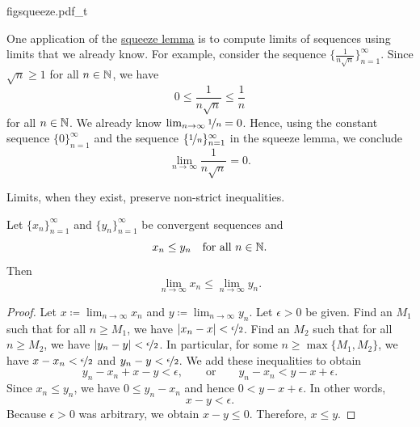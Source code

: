 \begin{myfigureht}
{figsqueeze.pdf_t}
\caption{Squeeze lemma proof in picture.\label{figsqueeze}}
\end{myfigureht}

\begin{example}
One application of
the \hyperref[squeeze:lemma]{squeeze lemma} is to compute limits of 
sequences using limits that we already know.  For example, consider
the sequence $\bigl\{ \frac{1}{n\sqrt{n}} \bigr\}_{n=1}^\infty$.
Since $\sqrt{n} \geq 1$ for all $n \in {\mathbb{N}}$, we have
\begin{equation*}
0 \leq \frac{1}{n\sqrt{n}} \leq \frac{1}{n}
\end{equation*}
for all $n \in {\mathbb{N}}$.  We already know $\lim_{n\to\infty} \nicefrac{1}{n} = 0$. 
Hence, using
the constant sequence $\{ 0 \}_{n=1}^\infty$ and the sequence
$\{ \nicefrac{1}{n} \}_{n=1}^\infty$ in the
squeeze lemma, we conclude
\begin{equation*}
\lim_{n\to\infty} \frac{1}{n\sqrt{n}} = 0 .
\end{equation*}
\end{example}

Limits, when they exist, preserve non-strict inequalities.

\begin{lemma} \label{limandineq:lemma}
Let $\{ x_n \}_{n=1}^\infty$ and $\{ y_n \}_{n=1}^\infty$ be
convergent sequences and
\begin{equation*}
x_n \leq y_n \quad \text{for all } n \in {\mathbb{N}} .
\end{equation*}
Then
\begin{equation*}
\lim_{n\to\infty} x_n \leq
\lim_{n\to\infty} y_n .
\end{equation*}
\end{lemma}

\begin{proof}
Let $x \coloneqq \lim_{n\to\infty} x_n$ and $y \coloneqq \lim_{n\to\infty} y_n$. 
Let 
$\epsilon > 0$ be given.  Find an $M_1$ such that for all $n \geq M_1$,
we have $\left\lvert {x_n-x} \right\rvert < \nicefrac{\epsilon}{2}$.  Find an $M_2$ such that
for all $n \geq M_2$, we have
$\left\lvert {y_n-y} \right\rvert < \nicefrac{\epsilon}{2}$.  In particular,
for some $n \geq \max\{ M_1, M_2 \}$, we have
$x-x_n < \nicefrac{\epsilon}{2}$ and
$y_n-y < \nicefrac{\epsilon}{2}$.  We add these inequalities to
obtain
\begin{equation*}
y_n-x_n+x-y < \epsilon, \qquad \text{or} \qquad
y_n-x_n < y-x+ \epsilon .
\end{equation*}
Since $x_n \leq y_n$, we have
$0 \leq y_n-x_n$ and hence $0 < y-x+ \epsilon$.
In other words,
\begin{equation*}
x-y < \epsilon .
\end{equation*}
Because $\epsilon > 0$ was arbitrary, we obtain
$x-y \leq 0$.
Therefore, $x \leq y$.
\end{proof}

